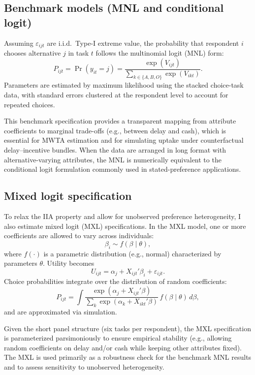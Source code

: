 \documentclass[doublespacing]{utdthesis}
\begin{document}
\subsection{Benchmark models (MNL and conditional logit)}
Assuming $\varepsilon_{ijt}$ are i.i.d.\ Type-I extreme value, the probability that respondent $i$ chooses alternative $j$ in task $t$ follows the multinomial logit (MNL) form:
\begin{equation}
P_{ijt} = \Pr(y_{it}=j) =
\frac{\exp(V_{ijt})}{\sum_{k \in \{A,B,O\}} \exp(V_{ikt})}.
\label{eq:essay2_mnl}
\end{equation}
Parameters are estimated by maximum likelihood using the stacked choice-task data, with standard errors clustered at the respondent level to account for repeated choices.

This benchmark specification provides a transparent mapping from attribute coefficients to marginal trade-offs (e.g., between delay and cash), which is essential for MWTA estimation and for simulating uptake under counterfactual delay--incentive bundles. When the data are arranged in long format with alternative-varying attributes, the MNL is numerically equivalent to the conditional logit formulation commonly used in stated-preference applications.

\subsection{Mixed logit specification}
To relax the IIA property and allow for unobserved preference heterogeneity, I also estimate mixed logit (MXL) specifications. In the MXL model, one or more coefficients are allowed to vary across individuals:
\begin{equation}
\beta_i \sim f(\beta \mid \theta),
\end{equation}
where $f(\cdot)$ is a parametric distribution (e.g., normal) characterized by parameters $\theta$. Utility becomes
\begin{equation}
U_{ijt} = \alpha_j + X_{ijt}'\beta_i + \varepsilon_{ijt}.
\end{equation}
Choice probabilities integrate over the distribution of random coefficients:
\begin{equation}
P_{ijt} = \int
\frac{\exp(\alpha_j + X_{ijt}'\beta)}
{\sum_{k}\exp(\alpha_k + X_{ikt}'\beta)}
\, f(\beta \mid \theta)\, d\beta,
\label{eq:essay2_mxl}
\end{equation}
and are approximated via simulation.

Given the short panel structure (six tasks per respondent), the MXL specification is parameterized parsimoniously to ensure empirical stability (e.g., allowing random coefficients on delay and/or cash while keeping other attributes fixed). The MXL is used primarily as a robustness check for the benchmark MNL results and to assess sensitivity to unobserved heterogeneity.
\end{document}
